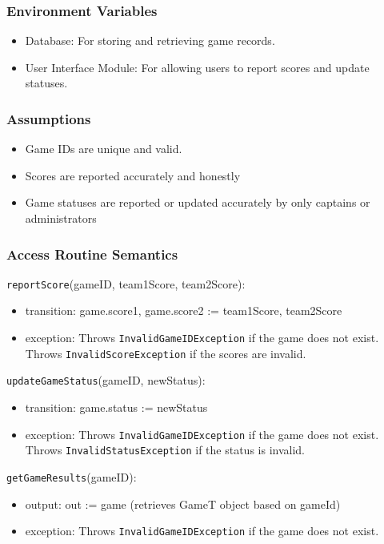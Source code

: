 \documentclass[12pt, titlepage]{article}
\begin{document}
\subsubsection{Environment Variables}

\begin{itemize}
  \item Database: For storing and retrieving game records.
  \item User Interface Module: For allowing users to report scores and update statuses.
\end{itemize}

\subsubsection{Assumptions}

\begin{itemize}
  \item Game IDs are unique and valid.
  \item Scores are reported accurately and honestly
  \item Game statuses are reported or updated accurately by only captains or administrators
\end{itemize}

\subsubsection{Access Routine Semantics}

\noindent \texttt{reportScore}(gameID, team1Score, team2Score):
\begin{itemize}
  \item transition: game.score1, game.score2 := team1Score, team2Score
  \item exception: Throws \texttt{InvalidGameIDException} if the game does not exist. Throws \texttt{InvalidScoreException} if the scores are invalid.
\end{itemize}

\noindent \texttt{updateGameStatus}(gameID, newStatus):
\begin{itemize}
  \item transition: game.status := newStatus
  \item exception: Throws \texttt{InvalidGameIDException} if the game does not exist. Throws \texttt{InvalidStatusException} if the status is invalid.
\end{itemize}

\noindent \texttt{getGameResults}(gameID):
\begin{itemize}
  \item output: out := game (retrieves GameT object based on gameId)
  \item exception: Throws \texttt{InvalidGameIDException} if the game does not exist.
\end{itemize}
\end{document}
